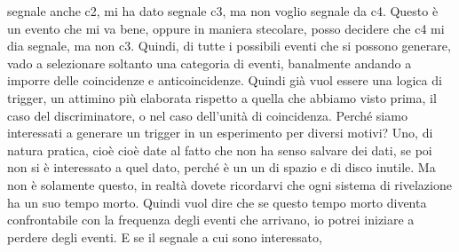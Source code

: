 {segnale anche c2, mi ha dato segnale c3, ma non voglio segnale da c4. Questo è un evento che mi va bene, oppure in maniera stecolare, posso decidere che c4 mi dia segnale, ma non c3. Quindi, di tutte i possibili eventi che si possono generare, vado a selezionare soltanto una categoria di eventi, banalmente andando a imporre delle coincidenze e anticoincidenze. Quindi già vuol essere una logica di trigger, un attimino più elaborata rispetto a quella che abbiamo visto prima, il caso del discriminatore, o nel caso dell'unità di coincidenza. Perché siamo interessati a generare un trigger in un esperimento per diversi motivi? Uno, di natura pratica, cioè cioè date al fatto che non ha senso salvare dei dati, se poi non si è interessato a quel dato, perché è un un di spazio e di disco inutile. Ma non è solamente questo, in realtà dovete ricordarvi che ogni sistema di rivelazione ha un suo tempo morto. Quindi vuol dire che se questo tempo morto diventa confrontabile con la frequenza degli eventi che arrivano, io potrei iniziare a perdere degli eventi. E se il segnale a cui sono interessato, 

}
